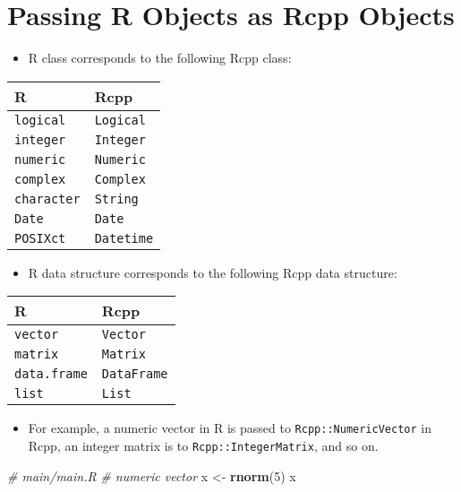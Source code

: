 \documentclass[
]{book}
\newenvironment{Shaded}{\begin{snugshade}}{\end{snugshade}}
\newcommand{\CommentTok}[1]{\textcolor[rgb]{0.56,0.35,0.01}{\textit{#1}}}
\newcommand{\DecValTok}[1]{\textcolor[rgb]{0.00,0.00,0.81}{#1}}
\newcommand{\KeywordTok}[1]{\textcolor[rgb]{0.13,0.29,0.53}{\textbf{#1}}}
\newcommand{\NormalTok}[1]{#1}
\newcommand{\StringTok}[1]{\textcolor[rgb]{0.31,0.60,0.02}{#1}}
\providecommand{\tightlist}{%
  \setlength{\itemsep}{0pt}\setlength{\parskip}{0pt}}
\begin{document}
\hypertarget{passing-r-objects-as-rcpp-objects}{%
\section{Passing R Objects as Rcpp Objects}\label{passing-r-objects-as-rcpp-objects}}

\begin{itemize}
\tightlist
\item
  R class corresponds to the following Rcpp class:
\end{itemize}

\begin{longtable}[]{@{}ll@{}}
\toprule
R & Rcpp\tabularnewline
\midrule
\endhead
\texttt{logical} & \texttt{Logical}\tabularnewline
\texttt{integer} & \texttt{Integer}\tabularnewline
\texttt{numeric} & \texttt{Numeric}\tabularnewline
\texttt{complex} & \texttt{Complex}\tabularnewline
\texttt{character} & \texttt{String}\tabularnewline
\texttt{Date} & \texttt{Date}\tabularnewline
\texttt{POSIXct} & \texttt{Datetime}\tabularnewline
\bottomrule
\end{longtable}

\begin{itemize}
\tightlist
\item
  R data structure corresponds to the following Rcpp data structure:
\end{itemize}

\begin{longtable}[]{@{}ll@{}}
\toprule
R & Rcpp\tabularnewline
\midrule
\endhead
\texttt{vector} & \texttt{Vector}\tabularnewline
\texttt{matrix} & \texttt{Matrix}\tabularnewline
\texttt{data.frame} & \texttt{DataFrame}\tabularnewline
\texttt{list} & \texttt{List}\tabularnewline
\bottomrule
\end{longtable}

\begin{itemize}
\tightlist
\item
  For example, a numeric vector in R is passed to \texttt{Rcpp::NumericVector} in Rcpp, an integer matrix is to \texttt{Rcpp::IntegerMatrix}, and so on.
\end{itemize}

\begin{Shaded}
\begin{Highlighting}[]
\CommentTok{# main/main.R}
\CommentTok{# numeric vector }
\NormalTok{x <-}\StringTok{ }\KeywordTok{rnorm}\NormalTok{(}\DecValTok{5}\NormalTok{)}
\NormalTok{x}
\end{Highlighting}
\end{Shaded}
\end{document}
